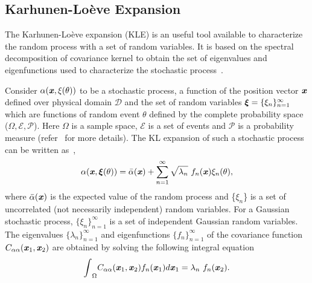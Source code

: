 \documentclass[letter,1p,11pt,oneside,onecolumn,sort&compress]{elsarticle}
\begin{document}
\subsection{Karhunen-Lo{\`e}ve Expansion} \label{sec:KLE}
The Karhunen-Lo{\`e}ve expansion (KLE) is an useful tool available to characterize the random process with a
set of random variables. It is based on the spectral decomposition of covariance kernel to obtain the set of eigenvalues and eigenfunctions used to characterize the stochastic process~\cite{ghanemSFEM1991,le2010spectral,ghanem1999ingredients}.

Consider $\alpha (\textbf{\textit{x}},  {\bf{\xi}}(\theta))$ to be a stochastic process, a function of the position vector $\textbf{\textit{x}}$ defined over physical domain $\mathcal{D}$ and the set of random variables $\mbox{\boldmath $\xi$} = \{ \xi_n \}_{n=1}^{\infty}$ which are functions of random event $\theta$ defined by the complete probability space ($\Omega, \mathcal{E}, \mathcal{P}$).  Here $\Omega$ is a sample space, $\mathcal{E}$ is a set of events and $\mathcal{P}$ is a probability measure (refer~\cite{billingsley2008probability} for more details).
The KL expansion of such a stochastic process can be written as~\cite{ghanemSFEM1991,ghanem1999ingredients},
\begin{equation}\label{eq:KLE}
\alpha (\textbf{\textit{x}},  {\mbox{\boldmath $\xi$}}(\theta)) = \bar{\alpha}(\textbf{\textit{x}}) + \sum^{\infty}_{n=1} \sqrt{{\lambda}_n} \ f_n(\textbf{\textit{x}}) {\xi_{n}}(\theta),
\end{equation}
where $\bar{\alpha}(\textbf{\textit{x}})$ is the expected value of the random process and \{${\xi_{n}}$\} is a set of uncorrelated (not necessarily independent) random variables. For a Gaussian  stochastic process, $\{ \xi_n \}_{n=1}^{\infty}$ is a set of independent Gaussian random variables. The eigenvalues
$\{ {\lambda}_n\}_{n=1}^{\infty}$ and eigenfunctions $\{ {f}_n \}_{n=1}^{\infty}$ of the covariance function $C_{\alpha\alpha}({\textbf{\textit{x}}}_1, {\textbf{\textit{x}}}_2)$ are obtained by solving the following integral equation~\cite{ghanemSFEM1991}
\begin{equation} \label{eq:cxx}
{\int}_{\Omega} C_{\alpha\alpha}({\textbf{\textit{x}}}_1, {\textbf{\textit{x}}}_2) f_n(\textbf{\textit{x}}_1) d{\textbf{\textit{x}}}_1 = {\lambda}_n \ f_n({\textbf{\textit{x}}}_2).
\end{equation}
\end{document}

